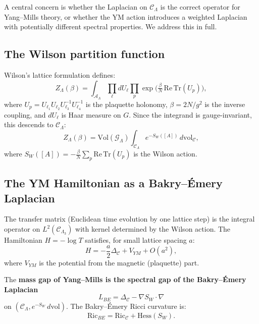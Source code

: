 \documentclass[11pt]{article}
\theoremstyle{definition}
\newcommand{\calA}{\mathcal{A}}
\newcommand{\calG}{\mathcal{G}}
\newcommand{\calC}{\mathcal{C}}
\newcommand{\Ric}{\mathrm{Ric}}
\newcommand{\Hess}{\mathrm{Hess}}
\newcommand{\Tr}{\mathrm{Tr}}
\begin{document}
A central concern is whether the Laplacian on $\calC_\Lambda$ is the correct operator for Yang--Mills theory, or whether the YM action introduces a weighted Laplacian with potentially different spectral properties. We address this in full.

\subsection{The Wilson partition function}

Wilson's lattice formulation \cite{Wilson74} defines:
\begin{equation}\label{eq:wilson-Z}
    Z_\Lambda(\beta) = \int_{\calA_\Lambda} \prod_\ell dU_\ell \prod_p \exp\bigl(\tfrac{\beta}{N}\, \mathrm{Re}\,\Tr(U_p)\bigr),
\end{equation}
where $U_p = U_{\ell_1} U_{\ell_2} U_{\ell_3}^{-1} U_{\ell_4}^{-1}$ is the plaquette holonomy, $\beta = 2N/g^2$ is the inverse coupling, and $dU_\ell$ is Haar measure on $G$. Since the integrand is gauge-invariant, this descends to $\calC_\Lambda$:
\begin{equation}\label{eq:wilson-quotient}
    Z_\Lambda(\beta) = \mathrm{Vol}(\calG_\Lambda) \int_{\calC_\Lambda} e^{-S_W([A])}\, d\mathrm{vol}_\calC,
\end{equation}
where $S_W([A]) = -\frac{\beta}{N}\sum_p \mathrm{Re}\,\Tr(U_p)$ is the Wilson action.

\subsection{The YM Hamiltonian as a Bakry--\'Emery Laplacian}

The transfer matrix (Euclidean time evolution by one lattice step) is the integral operator on $L^2(\calC_{\Lambda_3})$ with kernel determined by the Wilson action. The Hamiltonian $H = -\log T$ satisfies, for small lattice spacing $a$:
\begin{equation}\label{eq:hamiltonian}
    H = -\frac{a}{2} \Delta_\calC + V_{YM} + O(a^2),
\end{equation}
where $V_{YM}$ is the potential from the magnetic (plaquette) part.

The \textbf{mass gap of Yang--Mills is the spectral gap of the Bakry--\'Emery Laplacian}
\begin{equation}
    L_{BE} = \Delta_\calC - \nabla S_W \cdot \nabla
\end{equation}
on $(\calC_\Lambda, e^{-S_W}\, d\mathrm{vol})$. The Bakry--\'Emery Ricci curvature is:
\begin{equation}\label{eq:ric-BE}
    \Ric_{BE} = \Ric_{\calC} + \Hess(S_W).
\end{equation}
\end{document}

